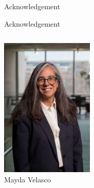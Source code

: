\begin{frame}{}
\large
    \begin{center}
        Acknowledgement
    \end{center}
\end{frame}


\begin{frame}{Acknowledgement}
    \begin{columns}
        \centering
        \includegraphics[height=0.5\textheight]{slides/figures/mayda}\\
        Mayda Velasco
        

\end{columns}
\end{frame}
